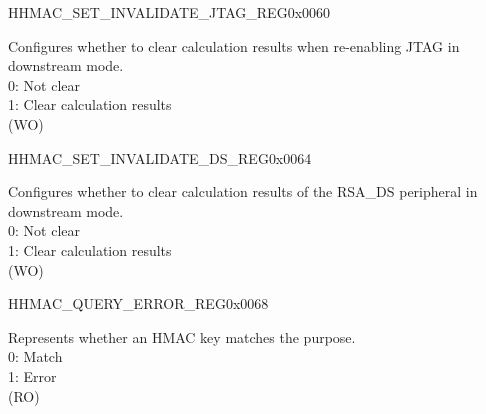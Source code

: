 \begin{register}{H}{HMAC\_SET\_INVALIDATE\_JTAG\_REG}{0x0060}\label{regdesc:HMACSETINVALIDATEJTAGREG}
%
%
\regnewline%
\begin{regdesc}\begin{reglist}
\label{fielddesc:HMACSETINVALIDATEJTAG}\item [HMAC\_SET\_INVALIDATE\_JTAG] Configures whether to clear calculation results when re-enabling JTAG in downstream mode.
\\0: Not clear
\\1: Clear calculation results
\\(WO)
\end{reglist}\end{regdesc}
\end{register}


\begin{register}{H}{HMAC\_SET\_INVALIDATE\_DS\_REG}{0x0064}\label{regdesc:HMACSETINVALIDATEDSREG}
%
%
\regnewline%
\begin{regdesc}\begin{reglist}
\label{fielddesc:HMACSETINVALIDATEDS}\item [HMAC\_SET\_INVALIDATE\_DS] Configures whether to clear calculation results of the RSA\_DS peripheral in downstream mode.
\\0: Not clear
\\1: Clear calculation results
\\(WO)
\end{reglist}\end{regdesc}
\end{register}


\begin{register}{H}{HMAC\_QUERY\_ERROR\_REG}{0x0068}\label{regdesc:HMACQUERYERRORREG}
%
%
\regnewline%
\begin{regdesc}\begin{reglist}
\label{fielddesc:HMACQUREYCHECK}\item [HMAC\_QUREY\_CHECK] Represents whether an HMAC key matches the purpose.
\\0: Match
\\1: Error
\\(RO)
\end{reglist}\end{regdesc}
\end{register}


